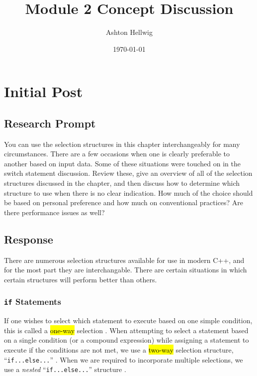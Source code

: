\documentclass[12pt]{report}
\title{Module 2 Concept Discussion}
\author{Ashton Hellwig}
\date{\today}
\newcommand{\CiteSection}[2]{%
    \parencite[~\S {#2}]{#1}
  }
\theoremstyle{definition}
\theoremstyle{plain}
\theoremstyle{plain}
\begin{document}
  \maketitle
  \tableofcontents
  \newpage


  \chapter{Initial Post}

    \section{Research Prompt}
      \begin{mdframed}[backgroundcolor=green!20]
        You can use the selection structures in this chapter interchangeably
          for many circumstances. There are a few occasions when one is clearly
          preferable to another based on input data. Some of these situations
          were touched on in the switch statement discussion. Review these, give
          an overview of all of the selection structures discussed in the
          chapter, and then discuss how to determine which structure to use when
          there is no clear indication. How much of the choice should be based
          on personal preference and how much on conventional practices? Are
          there performance issues as well?
      \end{mdframed}

    \section{Response}
      There are numerous selection structures available for use in modern C++,
        and for the most part they are interchangable. There are certain
        situations in which certain structures will perform better than others.

      \subsection{\texttt{if} Statements}
        If one wishes to select which statement to execute based on one simple
          condition, this is called a \hl{one-way} selection
          \CiteSection{malik_2015}{4-1d}. When attempting to select a statement
          based on a single condition (or a compound expression) while assigning
          a statement to execute if the conditions are not met, we use a
          \hl{two-way} selection structure, ``\texttt{if...else...}''
          \CiteSection{malik_2015}{4-1e}. When we are required to incorporate
          multiple selections, we use a \textit{nested}
          ``\texttt{if...else...}'' structure \CiteSection{malik_2015}{4-1l}.
\end{document}
